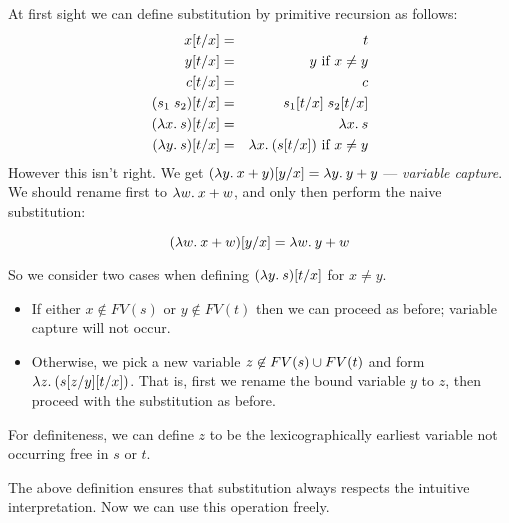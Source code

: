 \begin{slide*}


\vspace*{0.5cm}

At first sight we can define substitution by primitive recursion as follows:
{\red \begin{eqnarray*}
   x[t/x]            & = & t                           \\
   y[t/x]            & = & y \mbox{ if $x \not= y$}    \\
   c[t/x]            & = & c                           \\
   (s_1\;s_2)[t/x]   & = & s_1[t/x] \; s_2[t/x]        \\
   (\lambda x.\: s)[t/x] & = & \lambda x.\: s                  \\
   (\lambda y.\: s)[t/x] & = & \lambda x.\: (s[t/x]) \mbox{ if $x \not= y$}
\end{eqnarray*}}
However this isn't right. We get {\red $(\lambda y.\: x + y)[y/x] = \lambda y.\: y
+ y$} --- {\em variable capture}. We should rename first to {\red $\lambda w.\: x +
w$}, and only then perform the naive substitution:

{\red $$ (\lambda w.\: x + w)[y/x] = \lambda w.\: y + w $$}
\end{slide*}



\begin{slide*}


\vspace*{0.5cm}

So we consider two cases when defining {\red $(\lambda y.\: s)[t/x]$} for {\red $x
\not= y$}.

\begin{itemize}

\item If either {\red $x \not\in FV(s)$} or {\red $y \not\in FV(t)$} then we
can proceed as before; variable capture will not occur.

\item Otherwise, we pick a new variable {\red $z \not\in FV(s) \cup FV(t)$}
and form {\red $\lambda z.\: (s[z/y][t/x])$}. That is, first we rename the bound
variable {\red $y$} to {\red $z$}, then proceed with the substitution as
before.

\end{itemize}

For definiteness, we can define {\red $z$} to be the lexicographically earliest
variable not occurring free in {\red $s$} or {\red $t$}.

The above definition ensures that substitution always respects the intuitive
interpretation. Now we can use this operation freely.

\end{slide*}



